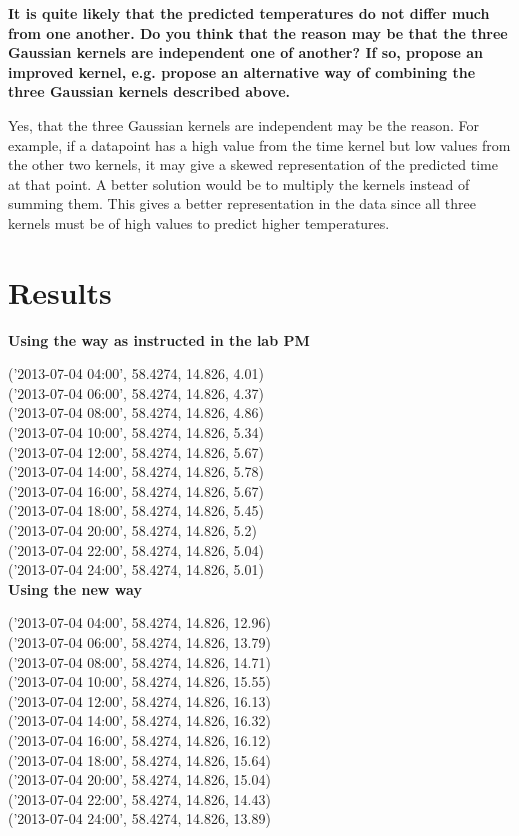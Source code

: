 \documentclass[a4paper,titlepage,12pt]{article}
\begin{document}
\textbf{It is quite likely that the predicted temperatures do not differ much from one another. Do you think that the reason may be that the three Gaussian kernels are independent one of another? If so, propose an improved kernel, e.g. propose an alternative way of combining the three Gaussian kernels described above.}

Yes, that the three Gaussian kernels are independent may be the reason. For
example, if a datapoint has a high value from the time kernel but low values
from the other two kernels, it may give a skewed representation of the predicted
time at that point. A better solution would be to multiply the kernels instead
of summing them. This gives a better representation in the data since all three
kernels must be of high values to predict higher temperatures. 

\section{Results}

\textbf{Using the way as instructed in the lab PM}

('2013-07-04 04:00', 58.4274, 14.826, 4.01) \\
('2013-07-04 06:00', 58.4274, 14.826, 4.37) \\
('2013-07-04 08:00', 58.4274, 14.826, 4.86) \\
('2013-07-04 10:00', 58.4274, 14.826, 5.34) \\
('2013-07-04 12:00', 58.4274, 14.826, 5.67) \\
('2013-07-04 14:00', 58.4274, 14.826, 5.78) \\
('2013-07-04 16:00', 58.4274, 14.826, 5.67) \\
('2013-07-04 18:00', 58.4274, 14.826, 5.45) \\
('2013-07-04 20:00', 58.4274, 14.826, 5.2) \\
('2013-07-04 22:00', 58.4274, 14.826, 5.04) \\
('2013-07-04 24:00', 58.4274, 14.826, 5.01) \\

\textbf{Using the new way}

('2013-07-04 04:00', 58.4274, 14.826, 12.96) \\
('2013-07-04 06:00', 58.4274, 14.826, 13.79) \\
('2013-07-04 08:00', 58.4274, 14.826, 14.71) \\
('2013-07-04 10:00', 58.4274, 14.826, 15.55) \\
('2013-07-04 12:00', 58.4274, 14.826, 16.13) \\
('2013-07-04 14:00', 58.4274, 14.826, 16.32) \\
('2013-07-04 16:00', 58.4274, 14.826, 16.12) \\
('2013-07-04 18:00', 58.4274, 14.826, 15.64) \\
('2013-07-04 20:00', 58.4274, 14.826, 15.04) \\
('2013-07-04 22:00', 58.4274, 14.826, 14.43) \\
('2013-07-04 24:00', 58.4274, 14.826, 13.89) \\
\end{document}
